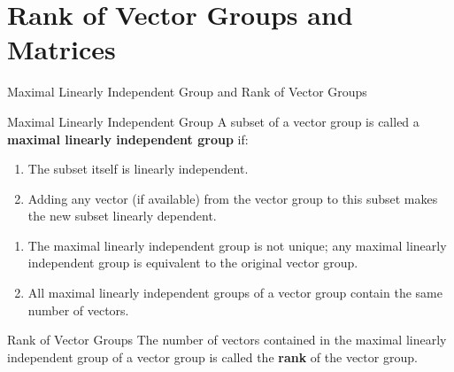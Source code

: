 \documentclass[11pt]{../../TexTemplate/elegantbook} %
\begin{document}
\section{Rank of Vector Groups and Matrices}
\begin{leftbarTitle}{Maximal Linearly Independent Group and Rank of Vector Groups}\end{leftbarTitle}
\begin{definition}{Maximal Linearly Independent Group}
    A subset of a vector group is called a \textbf{maximal linearly independent group} if:
    \begin{enumerate}
        \item The subset itself is linearly independent.
        \item Adding any vector (if available) from the vector group to this subset makes the new subset linearly dependent.
    \end{enumerate}
\end{definition}

\begin{property}
    \begin{enumerate}
    \item The maximal linearly independent group is not unique; 
        any maximal linearly independent group is equivalent to the original vector group.
    \item All maximal linearly independent groups of a vector group contain the same number of vectors.
\end{enumerate}
\end{property}

\begin{definition}{Rank of Vector Groups}
    The number of vectors contained in the maximal linearly independent group of a vector group 
    is called the \textbf{rank} of the vector group.
\end{definition}
\end{document}
